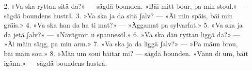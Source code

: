 2.  »Va ska ryttan sitä da?» — sägdä bounden.
    »Bäi mitt bour, pa min stoul.» — sägdä boundens hustrå.
3.  »Va ska ja da sitä ʃalv? —
    »Äi min späis, bäi min gräis.»
4.  »Va ska han da ha ti mat?» —
    »Äggamat pa sylvarfat.»
5.  »Va ska ja da jetä ʃalv?» —
    »Nävägroit u spannesöl.»
6.  »Va ska dän ryttan liggä da?» —
    »Äi mäin säŋg, pa min arm.»
7.  »Va ska ja da liggä ʃalv?» —
    »Pa mäun brou, bäi mäin sou.»
8.  »Män um soui bäitar mi? — sägdä bounden.
    »Vänn di um, bäit igänn.» — sägdä boundens hustrå.
